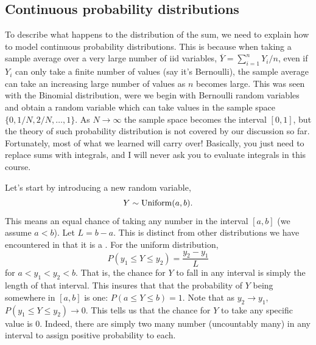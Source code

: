  \subsection{Continuous probability distributions}
To describe what happens to the distribution of the sum, we need to explain how to model continuous probability distributions. This is because when taking a sample average over a very large number of iid variables, $\overline{Y} = \sum_{i=1}^n Y_i/n$, even if $Y_i$ can only take a finite number of values (say it's Bernoulli), the sample average can take an increasing large number of values as $n$ becomes large. This was seen with the Binomial distribution, were we begin with Bernoulli random variables and obtain a random variable which can take values in the sample space $\{0,1/N,2/N,\dots,1\}$. As $N \to \infty$ the sample space becomes the interval $[0,1]$, but the theory of such probability distribution is not covered by our discussion so far. Fortunately, most of what we learned will carry over! Basically, you just need to replace sums with integrals, and I will never ask you to evaluate integrals in this course.  

Let's start by introducing a new random variable,  
 \begin{equation*}
 Y \sim {\rm Uniform}(a,b).
 \end{equation*}
This means an equal chance of taking any number in the interval $[a,b]$ (we assume $a<b$). Let $L=b-a$. This is distinct from other distributions we have encountered in that it is a .  For the uniform distribution, 
 \begin{equation*}
 P(y_1\le Y \le y_2) = \frac{y_2-y_1}{L}
 \end{equation*}
 for $a<y_1<y_2<b$. 
 That is, the chance for $Y$ to fall in any interval is simply the length of that interval. This insures that that the probability of $Y$ being somewhere in $[a,b]$ is one: $P(a\le Y\le b) = 1$. Note that as $y_2 \to y_1$, $P(y_1\le Y \le y_2) \to 0$. This tells us that the chance for $Y$ to take any specific value is $0$. Indeed, there are simply two many number (uncountably many) in any interval to assign positive probability to each.
 
